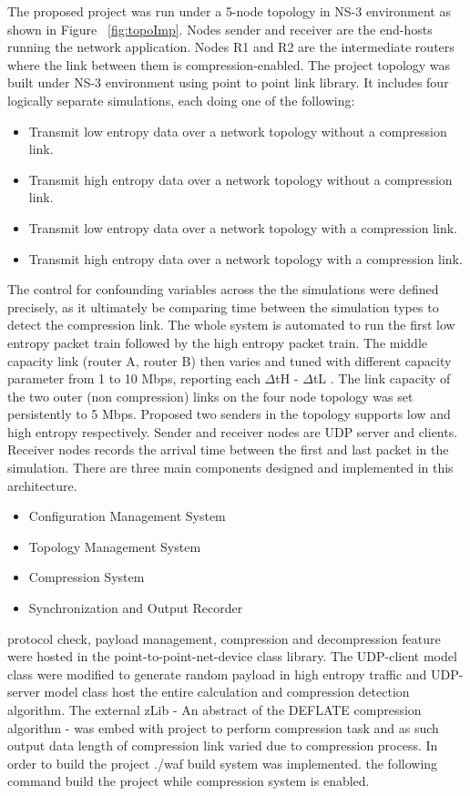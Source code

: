 \documentclass[sigconf]{acmart}
\begin{document}
The proposed project was run under a 5-node topology in NS-3 environment as shown in Figure ~\ref{fig:topoImp}. Nodes sender and receiver are the end-hosts running the network application. Nodes R1 and R2 are the intermediate routers where the link between them is compression-enabled. The project topology was built under NS-3 environment using point to point link library. It includes four logically separate simulations, each doing one of the following: 
\begin{itemize}
\item Transmit low entropy data over a network topology without a compression link.
\item Transmit high entropy data over a network topology without a compression link. 
\item Transmit low entropy data over a network topology with a compression link. 
\item Transmit high entropy data over a network topology with a compression link.
\end{itemize}

The control for confounding variables across the the simulations were defined precisely, as it ultimately be comparing time between the  simulation types to detect the compression link. The whole system is automated to run the first low entropy packet train followed by the high entropy packet train. 
The middle capacity link (router A, router B) then varies and tuned with different capacity parameter from 1 to 10 Mbps, reporting each $\Delta$tH - $\Delta$tL . The link capacity of the two outer (non compression) links on the four node topology was set persistently to 5 Mbps. Proposed two senders in the topology supports low and high entropy respectively. Sender and receiver nodes are UDP server and clients. Receiver nodes records the arrival time between the first and last packet in the simulation. There are three main components designed and implemented in this architecture.

\begin{itemize}
\item Configuration Management System
\item Topology Management System
\item Compression System
\item Synchronization and Output Recorder
\end{itemize}

protocol check, payload management, compression and decompression feature were hosted in the point-to-point-net-device class library. The UDP-client model class were modified to generate random payload in high entropy traffic and UDP-server model class host the entire calculation and compression detection algorithm. The external zLib \cite{Deutsch:1996:ZCD:RFC1950} - An abstract of the DEFLATE compression algorithm - was embed with project to perform compression task and as such output data length of compression link varied due to compression process.  
In order to build the project ./waf build system was implemented. the following command build the project while compression system is enabled. 
 
\end{document}
